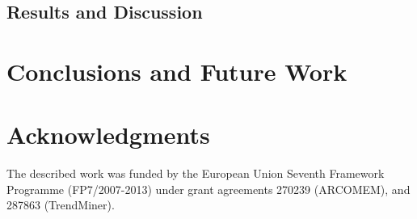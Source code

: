 \documentclass{../acm_proc_article-me11_tweaked}
\begin{document}
\subsection{Results and Discussion}

\section{Conclusions and Future Work}

\section{Acknowledgments}
The described work was funded by the European Union Seventh Framework Programme (FP7/2007-2013) under grant agreements 270239 (ARCOMEM), and 287863 (TrendMiner).




\end{document}
